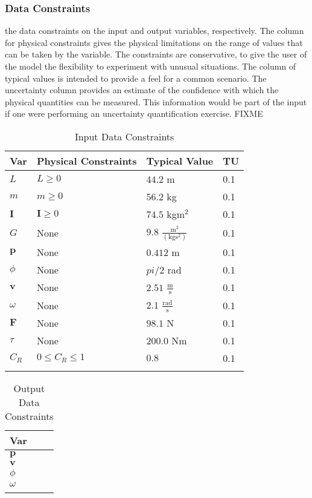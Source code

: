 \documentclass[12pt]{article}
\begin{document}
\subsubsection{Data Constraints}
\label{Sec:DataConstraints}
the data constraints on the input and output variables, respectively. The column for physical constraints gives the physical limitations on the range of values that can be taken by the variable. The constraints are conservative, to give the user of the model the flexibility to experiment with unusual situations. The column of typical values is intended to provide a feel for a common scenario. The uncertainty column provides an estimate of the confidence with which the physical quantities can be measured. This information would be part of the input if one were performing an uncertainty quantification exercise. FIXME
\begin{longtable}{l l l l}
\toprule
Var & Physical Constraints & Typical Value & TU
\\
\midrule
$L$ & $L\geq{}0$ & $44.2$ m & 0.1
\\
$m$ & $m\geq{}0$ & $56.2$ kg & 0.1
\\
$\mathbf{I}$ & $\mathbf{I}\geq{}0$ & $74.5$ kg$\text{m}^{2}$ & 0.1
\\
$G$ & None & $9.8$ $\frac{\text{m}^{3}}{(\text{kg}\text{s}^{2})}$ & 0.1
\\
$\mathbf{p}$ & None & $0.412$ m & 0.1
\\
$\phi{}$ & None & $pi/2$ rad & 0.1
\\
$\mathbf{v}$ & None & $2.51$ $\frac{\text{m}}{\text{s}}$ & 0.1
\\
$\omega{}$ & None & $2.1$ $\frac{\text{rad}}{\text{s}}$ & 0.1
\\
$\mathbf{F}$ & None & $98.1$ N & 0.1
\\
$\tau{}$ & None & $200.0$ Nm & 0.1
\\
${C_{R}}$ & $0\leq{}{C_{R}}\leq{}1$ & $0.8$ & 0.1
\\
\bottomrule
\caption{Input Data Constraints}
\label{Table:InDataConstraints}
\end{longtable}
\begin{longtable}{l}
\toprule
Var
\\
\midrule
$\mathbf{p}$
\\
$\mathbf{v}$
\\
$\phi{}$
\\
$\omega{}$
\\
\bottomrule
\caption{Output Data Constraints}
\label{Table:OutDataConstraints}
\end{longtable}
\end{document}
